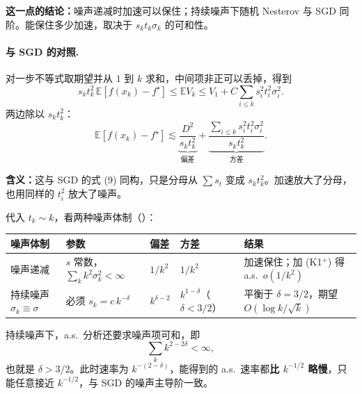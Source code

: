 \documentclass[11pt]{ctexart}
\newcommand{\E}{\mathbb{E}}
\begin{document}
\textbf{这一点的结论：}噪声递减时加速可以保住；持续噪声下随机 Nesterov 与 SGD 同阶。能保住多少加速，取决于 $s_kt_k\sigma_k$ 的可和性。

\paragraph{与 SGD 的对照.}
对一步不等式取期望并从 $1$ 到 $k$ 求和，中间项非正可以丢掉，得到
\[
s_kt_k^2\,\E[f(x_k)-f^\star]\le\E V_k\le V_1+C\sum_{i\le k}s_i^2t_i^2\sigma_i^2 .
\]
两边除以 $s_kt_k^2$：
\[
\E[f(x_k)-f^\star]
\lesssim
\underbrace{\frac{D^2}{s_kt_k^2}}_{\text{偏差}}
+\underbrace{\frac{\sum_{i\le k}s_i^2t_i^2\sigma_i^2}{s_kt_k^2}}_{\text{方差}} .
\]

\textbf{含义：}这与 SGD 的式 (9) 同构，只是分母从 $\sum s_t$ 变成 $s_kt_k^2$。加速放大了分母，也用同样的 $t_i^2$ 放大了噪声。

代入 $t_k\sim k$，看两种噪声体制（\citealp[Remark~3.2]{attouch2026ravine}）：

\begin{center}
\begin{tabularx}{\linewidth}{@{}l>{\raggedright\arraybackslash}Xlll@{}}
\toprule
噪声体制 & 参数 & 偏差 & 方差 & 结果 \\
\midrule
噪声递减 & $s$ 常数，$\sum_k k^2\sigma_k^2<\infty$ & $1/k^2$ & $1/k^2$ & 加速保住；加 (K1$^+$) 得 a.s.\ $o(1/k^2)$ \\
持续噪声 $\sigma_k\equiv\sigma$ & 必须 $s_k=c\,k^{-\delta}$ & $k^{\delta-2}$ & $k^{1-\delta}$（$\delta<3/2$） & 平衡于 $\delta=3/2$，期望 $O(\log k/\sqrt k)$ \\
\bottomrule
\end{tabularx}
\end{center}

持续噪声下，a.s.\ 分析还要求噪声项可和，即
\[
\sum_k k^{2-2\delta}<\infty,
\]
也就是 $\delta>3/2$。此时速率为 $k^{-(2-\delta)}$，能得到的 a.s.\ 速率都\textbf{比 $k^{-1/2}$ 略慢}，只能任意接近 $k^{-1/2}$，与 SGD 的噪声主导阶一致。



\end{document}
